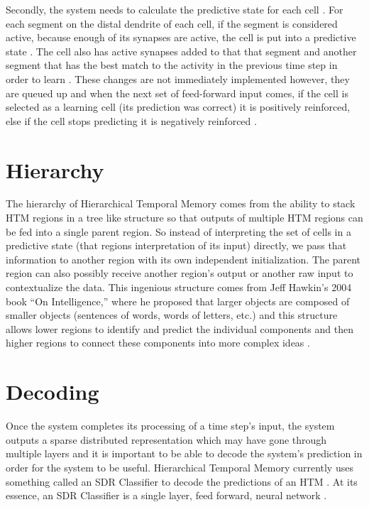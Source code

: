 \documentclass[oneside,12pt,openany]{book}
\begin{document}
	Secondly, the system needs to calculate the predictive state for each cell \cite{Whitepaper}. For each segment on the distal dendrite of each cell, if the segment is considered active, because enough of its synapses are active, the cell is put into a predictive state \cite{Principles}. The cell also has active synapses added to that that segment and another segment that has the best match to the activity in the previous time step in order to learn \cite{Whitepaper}. These changes are not immediately implemented however, they are queued up and when the next set of feed-forward input comes, if the cell is selected as a learning cell (its prediction was correct) it is positively reinforced, else if the cell stops predicting it is negatively reinforced \cite{Whitepaper}.
	
	\section{Hierarchy}
	
	The hierarchy of Hierarchical Temporal Memory comes from the ability to stack HTM regions in a tree like structure so that outputs of multiple HTM regions can be fed into a single parent region. So instead of interpreting the set of cells in a predictive state (that regions interpretation of its input) directly, we pass that information to another region with its own independent initialization. The parent region can also possibly receive another region's output or another raw input to contextualize the data. This ingenious structure comes from Jeff Hawkin's 2004 book ``On Intelligence,'' where he proposed that larger objects are composed of smaller objects (sentences of words, words of letters, etc.) and this structure allows lower regions to identify and predict the individual components and then higher regions to connect these components into more complex ideas \cite{Evaluation}.
	
	\section{Decoding}
	
	Once the system completes its processing of a time step's input, the system outputs a sparse distributed representation which may have gone through multiple layers and it is important to be able to decode the system's prediction in order for the system to be useful. Hierarchical Temporal Memory currently uses something called an SDR Classifier to decode the predictions of an HTM \cite{Dillon}. At its essence, an SDR Classifier is a single layer, feed forward, neural network \cite{Dillon}.
\end{document}
